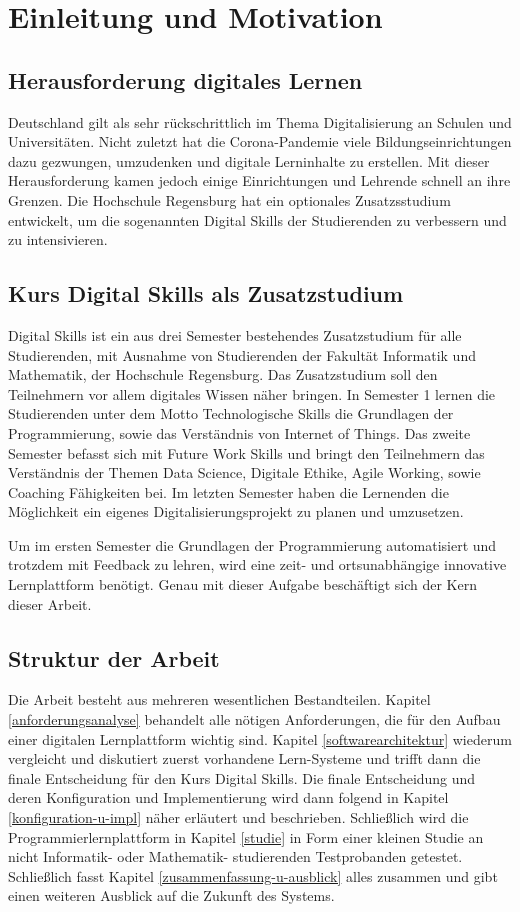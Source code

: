 \section{Einleitung und Motivation}\label{einleitung}
\subsection{Herausforderung digitales Lernen}\label{herausforderung}
Deutschland gilt als sehr rückschrittlich im Thema Digitalisierung an Schulen
und Universitäten. Nicht zuletzt hat die Corona-Pandemie viele
Bildungseinrichtungen dazu gezwungen, umzudenken und digitale Lerninhalte
zu erstellen. Mit dieser Herausforderung kamen jedoch einige Einrichtungen und
Lehrende schnell an ihre Grenzen. Die Hochschule Regensburg hat ein optionales
Zusatzsstudium entwickelt, um die sogenannten \glqq Digital Skills\grqq{}
der Studierenden zu verbessern und zu intensivieren. 

\subsection{Kurs Digital Skills als Zusatzstudium}\label{kurs-digital-skills}
Digital Skills ist ein aus drei Semester bestehendes Zusatzstudium für alle
Studierenden, mit Ausnahme von Studierenden der Fakultät Informatik und
Mathematik, der Hochschule Regensburg. Das Zusatzstudium soll den Teilnehmern
vor allem digitales Wissen näher bringen. In Semester 1 lernen die Studierenden
unter dem Motto \glqq Technologische Skills\grqq{} die Grundlagen der
Programmierung, sowie das Verständnis von Internet of Things. Das zweite
Semester befasst sich mit \glqq Future Work Skills\grqq{} und bringt den
Teilnehmern das Verständnis der Themen Data Science, Digitale Ethike,
Agile Working, sowie Coaching Fähigkeiten bei. Im letzten Semester haben die
Lernenden die Möglichkeit ein eigenes Digitalisierungsprojekt zu planen und
umzusetzen.

Um im ersten Semester die Grundlagen der Programmierung automatisiert und
trotzdem mit Feedback zu lehren, wird eine zeit- und ortsunabhängige innovative
Lernplattform benötigt. Genau mit dieser Aufgabe beschäftigt sich der Kern
dieser Arbeit.

\subsection{Struktur der Arbeit}\label{struktur-der-arbeit}
Die Arbeit besteht aus mehreren wesentlichen Bestandteilen. Kapitel
\ref{anforderungsanalyse} behandelt alle nötigen Anforderungen, die für den
Aufbau einer digitalen Lernplattform wichtig sind. Kapitel
\ref{softwarearchitektur} wiederum vergleicht und diskutiert zuerst vorhandene
Lern-Systeme und trifft dann die finale Entscheidung für den Kurs Digital
Skills. Die finale Entscheidung und deren Konfiguration und Implementierung wird
dann folgend in Kapitel \ref{konfiguration-u-impl} näher erläutert und
beschrieben. Schließlich wird die Programmierlernplattform in Kapitel
\ref{studie} in Form einer kleinen Studie an nicht Informatik- oder Mathematik-
studierenden Testprobanden getestet. Schließlich fasst Kapitel
\ref{zusammenfassung-u-ausblick} alles zusammen und gibt einen weiteren Ausblick
auf die Zukunft des Systems.